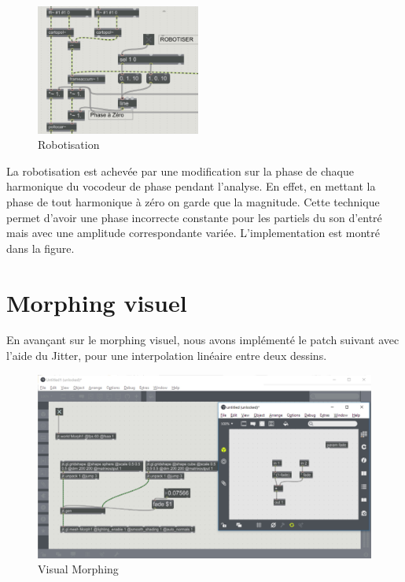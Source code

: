 \begin{figure}
  \vspace{-20pt}
  \begin{center}
    \includegraphics[width=0.48\textwidth]{Graphs/Robotisation.png}
  \end{center}
  \vspace{-20pt}
  \caption{Robotisation}
  \vspace{-10pt}
\end{figure}

    La robotisation est achevée par une modification sur la phase de chaque harmonique du vocodeur de phase pendant l'analyse. En effet, en mettant la phase de tout harmonique à zéro on garde que la magnitude. Cette technique permet d'avoir une phase incorrecte constante pour les partiels du son d'entré mais avec une amplitude correspondante variée.
    L'implementation est montré dans la figure.
  

\section{Morphing visuel}

En avançant sur le morphing visuel, nous avons implémenté le patch suivant avec l’aide du Jitter, pour une interpolation linéaire entre deux dessins.

    \begin{figure}
        \centering
        \includegraphics[width = \textwidth ]{Graphs/Morphing_patch.jpg}
        \caption{Visual Morphing}
        \label{VisualMorph}
    \end{figure}


